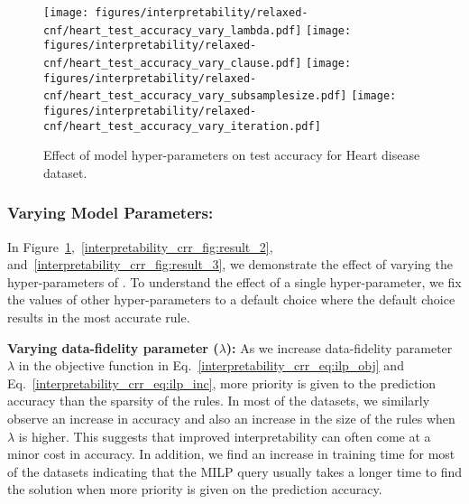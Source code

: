 \begin{figure}[t]
	\centering
	\subfloat
	{\texttt{[image: figures/interpretability/relaxed-cnf/heart\_test\_accuracy\_vary\_lambda.pdf]}\label{interpretability_crr_fig:d}} \hfill
	\subfloat
	{\texttt{[image: figures/interpretability/relaxed-cnf/heart\_test\_accuracy\_vary\_clause.pdf]}\label{interpretability_crr_fig:f}} \hfill
	\subfloat
	{\texttt{[image: figures/interpretability/relaxed-cnf/heart\_test\_accuracy\_vary\_subsamplesize.pdf]}
		\label{interpretability_crr_fig:a}} \hfill
	\subfloat
	{\texttt{[image: figures/interpretability/relaxed-cnf/heart\_test\_accuracy\_vary\_iteration.pdf]}\label{interpretability_crr_fig:g}} \hfill
	\caption[Effect of hyper-parameters on accuracy in {\crr}]{Effect of model hyper-parameters on test accuracy  for  Heart disease dataset. } 
	\label{interpretability_crr_fig:result_1}
\end{figure}
	

	\subsubsection*{Varying Model Parameters: }
	\label{interpretability_crr_sec:model_parameters}
	In Figure~\ref{interpretability_crr_fig:result_1},~\ref{interpretability_crr_fig:result_2}, and~\ref{interpretability_crr_fig:result_3}, we demonstrate the effect of varying the hyper-parameters of {\crr}. To understand the effect of a single hyper-parameter, we fix the values of other hyper-parameters to a default choice where the default choice results in the most accurate rule. 
	 

	\textbf{Varying data-fidelity parameter ($ \lambda $):}  As we increase data-fidelity parameter $ \lambda $ in the objective function in Eq.~\ref{interpretability_crr_eq:ilp_obj} and Eq.~\ref{interpretability_crr_eq:ilp_inc}, more priority is given to the prediction accuracy than the sparsity of the rules.  In most of the datasets, we similarly observe an increase in accuracy  and also an increase in the size of the rules when $ \lambda $ is higher. This suggests that improved interpretability can often come at a  minor cost in accuracy.  
	In addition, we  find an increase in training time for most of the datasets indicating that the MILP query usually takes a longer time to find the solution when more priority is given on the prediction accuracy.  
	

